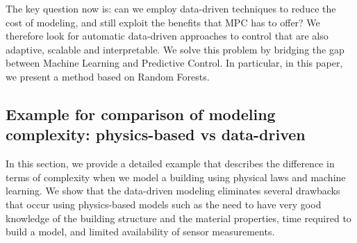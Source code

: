 The key question now is: can we employ data-driven techniques to reduce the cost of modeling, and still exploit the benefits that MPC has to offer?
We therefore look for automatic data-driven approaches to control that are also adaptive, scalable and interpretable.
We solve this problem by bridging the gap between Machine Learning and Predictive Control. In particular, in this paper, we present a method based on Random Forests.


\subsection{Example for comparison of modeling complexity: physics-based vs data-driven}
In this section, we provide a detailed example that describes the difference in terms of complexity when we model a building using physical laws and machine learning.
We show that the data-driven modeling eliminates several drawbacks that occur using physics-based models such as the need to have very good knowledge of the building structure and the material properties, time required to build a model, and limited availability of sensor measurements.

